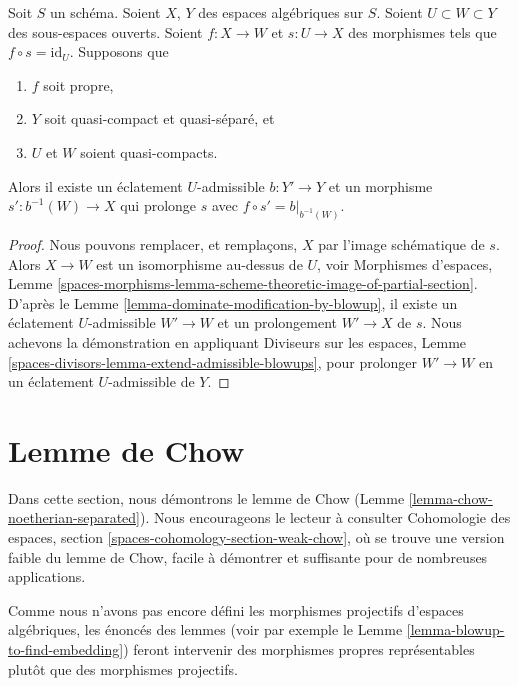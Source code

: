 \begin{lemma}
\label{lemma-get-section-after-blowup}
Soit $S$ un schéma. Soient $X$, $Y$ des espaces algébriques sur $S$.
Soient $U \subset W \subset Y$ des sous-espaces ouverts.
Soient $f : X \to W$ et $s : U \to X$ des morphismes
tels que $f \circ s = \text{id}_U$. Supposons que
\begin{enumerate}
\item $f$ soit propre,
\item $Y$ soit quasi-compact et quasi-séparé, et
\item $U$ et $W$ soient quasi-compacts.
\end{enumerate}
Alors il existe un éclatement $U$-admissible $b : Y' \to Y$ et un morphisme
$s' : b^{-1}(W) \to X$ qui prolonge $s$ avec $f \circ s' = b|_{b^{-1}(W)}$.
\end{lemma}

\begin{proof}
Nous pouvons remplacer, et remplaçons, $X$ par l'image schématique de $s$.
Alors $X \to W$ est un isomorphisme au-dessus de $U$, voir
Morphismes d'espaces, Lemme
\ref{spaces-morphisms-lemma-scheme-theoretic-image-of-partial-section}.
D'après le Lemme \ref{lemma-dominate-modification-by-blowup},
il existe un éclatement $U$-admissible $W' \to W$ et un
prolongement $W' \to X$ de $s$.
Nous achevons la démonstration en appliquant
Diviseurs sur les espaces, Lemme \ref{spaces-divisors-lemma-extend-admissible-blowups},
pour prolonger $W' \to W$ en un éclatement $U$-admissible de $Y$.
\end{proof}















\section{Lemme de Chow}
\label{section-chow}

\noindent
Dans cette section, nous démontrons le lemme de Chow
(Lemme \ref{lemma-chow-noetherian-separated}).
Nous encourageons le lecteur à consulter
Cohomologie des espaces, section \ref{spaces-cohomology-section-weak-chow},
où se trouve une version faible du lemme de Chow, facile à démontrer et suffisante
pour de nombreuses applications.

\medskip\noindent
Comme nous n'avons pas encore défini les morphismes projectifs d'espaces algébriques,
les énoncés des lemmes (voir par exemple le
Lemme \ref{lemma-blowup-to-find-embedding}) feront intervenir
des morphismes propres représentables plutôt que des morphismes projectifs.

